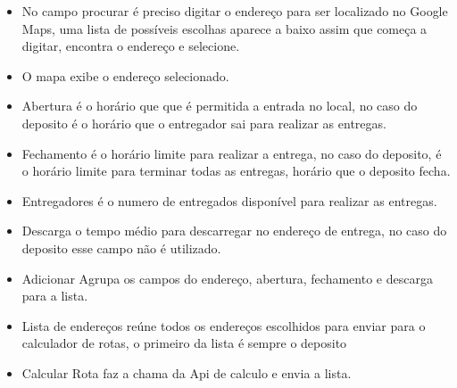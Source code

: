 \begin{itemize}
	\item No campo procurar é preciso digitar o endereço para ser localizado no Google Maps, uma lista de possíveis escolhas aparece a baixo assim que começa a digitar, encontra o endereço e selecione.
	\item O mapa exibe o endereço selecionado.
	\item Abertura é o horário que que é permitida a entrada no local, no caso do deposito é o horário que o entregador sai para realizar as entregas.
	\item Fechamento é o horário limite para realizar a entrega, no caso do deposito, é o horário limite para terminar todas as entregas, horário que o deposito fecha.
	\item Entregadores é o numero de entregados disponível para realizar as entregas.
	\item Descarga o tempo médio para descarregar no endereço de entrega, no caso do deposito esse campo não é utilizado.
	\item Adicionar Agrupa os campos do endereço, abertura, fechamento e descarga para a lista.
	\item Lista de endereços reúne todos os endereços escolhidos para enviar para o calculador de rotas, o primeiro da lista é sempre o deposito
	\item Calcular Rota faz a chama da Api de calculo e envia a lista.
\end{itemize}

\begin{center}
	\label{fig:InterfaceResultado}
\end{center}

